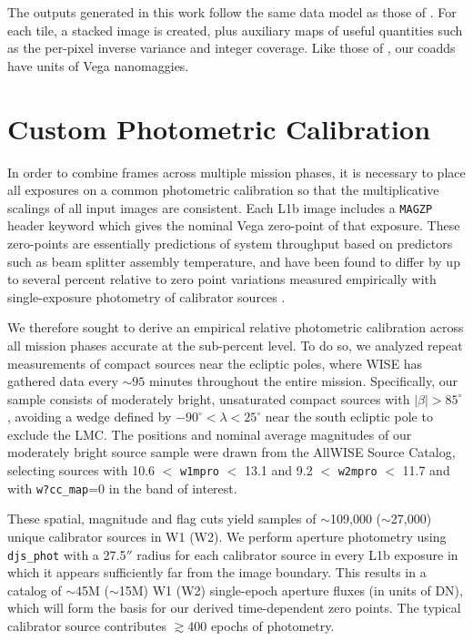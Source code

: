 \documentclass{emulateapj}
\begin{document}
The outputs generated in this work follow the same data model as those of 
\cite{lang14}. For each tile, a stacked image is created, plus auxiliary
maps of useful quantities such as the per-pixel inverse variance and integer 
coverage. Like those of \cite{lang14}, our coadds have units of Vega 
nanomaggies.

\section{Custom Photometric Calibration}
\label{sec:calib}

In order to combine frames across multiple mission phases, it is necessary
to place all exposures on a common photometric calibration so that
the multiplicative scalings of all input images are consistent. Each L1b
image includes a \verb|MAGZP| header keyword which gives the nominal
Vega zero-point of that exposure. These zero-points are essentially
predictions of system throughput based on predictors such as beam splitter
assembly temperature, and have been found to differ by up to several percent 
relative to zero point variations measured empirically with single-exposure
photometry of calibrator sources \citep{cutri13, cutri15}.


We therefore sought to derive an empirical relative photometric calibration
across all mission phases accurate at the sub-percent level. To do so, we 
analyzed repeat measurements of compact sources near the 
ecliptic poles, where WISE has gathered data every $\sim$$95$ minutes 
throughout the entire mission. Specifically, our sample consists of moderately 
bright, unsaturated compact sources with $|\beta| > 85^{\circ}$, avoiding a 
wedge defined by $-90^{\circ}$$<$$\lambda$$<25^{\circ}$ near the south ecliptic
pole to exclude the LMC. The positions and nominal average magnitudes of our 
moderately bright source sample were drawn from the AllWISE Source Catalog, 
selecting sources with 10.6 $<$ \verb|w1mpro| $<$ 13.1 and 9.2 $<$ 
\verb|w2mpro| $<$ 11.7 and with \verb|w?cc_map|=0 in the band of interest.

These spatial, magnitude and flag cuts yield samples of $\sim$109,000 
($\sim$27,000) unique calibrator sources in W1 (W2). We perform aperture 
photometry using \verb|djs_phot| with a 27.5$''$ radius for each calibrator 
source in every L1b exposure in which it appears sufficiently far from the 
image boundary. This results in a catalog of $\sim$45M ($\sim$15M) W1 (W2) 
single-epoch aperture fluxes (in units of DN), which will form the basis for 
our derived time-dependent zero points. The typical calibrator source 
contributes $\gtrsim$400 epochs of photometry.
\end{document}
